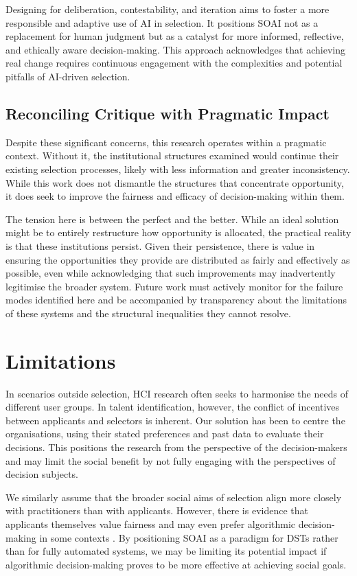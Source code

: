Designing for deliberation, contestability, and iteration aims to foster a more responsible and adaptive use of AI in selection. It positions SOAI not as a replacement for human judgment but as a catalyst for more informed, reflective, and ethically aware decision-making. This approach acknowledges that achieving real change requires continuous engagement with the complexities and potential pitfalls of AI-driven selection.

\subsection{Reconciling Critique with Pragmatic Impact}
Despite these significant concerns, this research operates within a pragmatic context. Without it, the institutional structures examined would continue their existing selection processes, likely with less information and greater inconsistency. While this work does not dismantle the structures that concentrate opportunity, it does seek to improve the fairness and efficacy of decision-making within them.

The tension here is between the perfect and the better. While an ideal solution might be to entirely restructure how opportunity is allocated, the practical reality is that these institutions persist. Given their persistence, there is value in ensuring the opportunities they provide are distributed as fairly and effectively as possible, even while acknowledging that such improvements may inadvertently legitimise the broader system. Future work must actively monitor for the failure modes identified here and be accompanied by transparency about the limitations of these systems and the structural inequalities they cannot resolve.

\section{Limitations}
In scenarios outside selection, HCI research often seeks to harmonise the needs of different user groups. In talent identification, however, the conflict of incentives between applicants and selectors is inherent. Our solution has been to centre the organisations, using their stated preferences and past data to evaluate their decisions. This positions the research from the perspective of the decision-makers and may limit the social benefit by not fully engaging with the perspectives of decision subjects.

We similarly assume that the broader social aims of selection align more closely with practitioners than with applicants. However, there is evidence that applicants themselves value fairness and may even prefer algorithmic decision-making in some contexts \cite{10.1145/3351095.3372867}. By positioning SOAI as a paradigm for DSTs rather than for fully automated systems, we may be limiting its potential impact if algorithmic decision-making proves to be more effective at achieving social goals.

